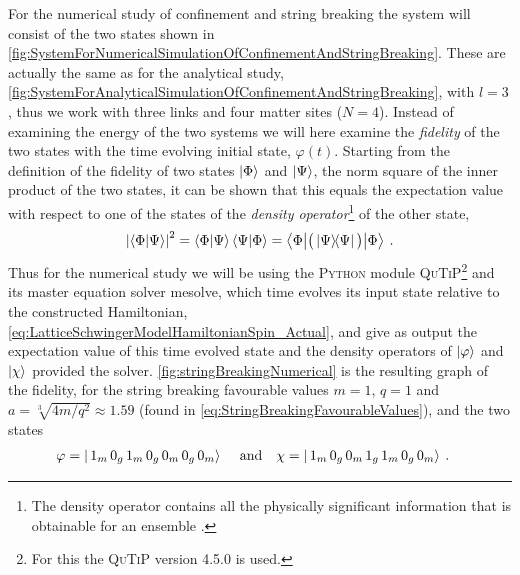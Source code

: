 \documentclass[../main.tex]{subfiles} %
\begin{document}
For the numerical study of confinement and string breaking the system will consist of the two states shown in \cref{fig:SystemForNumericalSimulationOfConfinementAndStringBreaking}. These are actually the same as for the analytical study, \cref{fig:SystemForAnalyticalSimulationOfConfinementAndStringBreaking}, with $l=3$, thus we work with three links and four matter sites ($N=4$). Instead of examining the energy of the two systems we will here examine the \emph{fidelity} of the two states with the time evolving initial state, $\varphi(t)$. Starting from the definition of the fidelity of two states $\ket{\Phi}$ and $\ket{\Psi}$, the norm square of the inner product of the two states, it can be shown that this equals the expectation value with respect to one of the states of the \emph{density operator}\footnote{The density operator contains all the physically significant information that is obtainable for an ensemble \cite{sakurai_modernQM_2017}.} of the other state,
\begin{align}
    \abs{\innerproduct{\Phi}{\Psi}}^2
    = \innerproduct{\Phi}{\Psi}\innerproduct{\Psi}{\Phi}
    = \mel**{\Phi}{\big( \outerproduct{\Psi} \big)}{\Phi} \: .
\end{align}
Thus for the numerical study we will be using the \textsc{Python} module \textsc{QuTiP}\footnote{For this the \textsc{QuTiP} version 4.5.0 is used.} and its master equation solver \textsf{mesolve}, which time evolves its input state relative to the constructed Hamiltonian, \cref{eq:LatticeSchwingerModelHamiltonianSpin_Actual}, and give as output the expectation value of this time evolved state and the density operators of $\ket{\varphi}$ and $\ket{\chi}$ provided the solver. \cref{fig:stringBreakingNumerical} is the resulting graph of the fidelity, for the string breaking favourable values $m=1$, $q=1$ and $a = \sqrt[3\:\:]{4m/q^2} \approx \num{1.59}$ (found in \cref{eq:StringBreakingFavourableValues}), and the two states
\begin{align}
    \varphi &= \ket{\, 1_m\, 0_g\, 1_m\, 0_g\, 0_m\, 0_g\, 0_m} \: \quad \text{and} \quad \chi = \ket{\, 1_m\, 0_g\, 0_m\, 1_g\, 1_m\, 0_g\, 0_m} \: .
\end{align}
\end{document}
